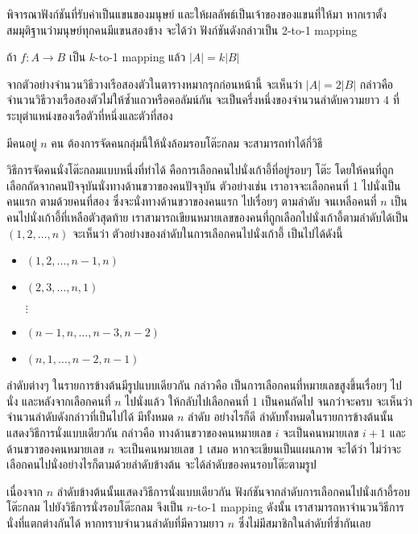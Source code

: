 \begin{example}
พิจารณาฟังก์ชันที่รับค่าเป็นแขนของมนุษย์ และให้ผลลัพธ์เป็นเจ้าของของแขนที่ให้มา \enskip หากเราตั้งสมมุติฐานว่ามนุษย์ทุกคนมีแขนสองข้าง จะได้ว่า ฟังก์ชันดังกล่าวเป็น 2-to-1 mapping
\end{example}

\begin{theorem}
ถ้า $f:A\to B$ เป็น $k$-to-1 mapping แล้ว $|A|=k|B|$
\end{theorem}

จากตัวอย่างจำนวนวิธีวางเรือสองตัวในตารางหมากรุกก่อนหน้านี้ จะเห็นว่า $|A|=2|B|$ กล่าวคือ จำนวนวิธีวางเรือสองตัวไม่ให้ซ้ำแถวหรือคอลัมน์กัน จะเป็นครึ่งหนึ่งของจำนวนลำดับความยาว 4 ที่ระบุตำแหน่งของเรือตัวที่หนึ่งและตัวที่สอง

\begin{example}
มีคนอยู่ $n$ คน ต้องการจัดคนกลุ่มนี้ให้นั่งล้อมรอบโต๊ะกลม จะสามารถทำได้กี่วิธี

วิธีการจัดคนนั่งโต๊ะกลมแบบหนึ่งที่ทำได้ คือการเลือกคนไปนั่งเก้าอี้ที่อยู่รอบๆ โต๊ะ โดยให้คนที่ถูกเลือกถัดจากคนปัจจุบันนั่งทางด้านขวาของคนปัจจุบัน \enskip ตัวอย่างเช่น เราอาจจะเลือกคนที่ 1 ไปนั่งเป็นคนแรก ตามด้วยคนที่สอง ซึ่งจะนั่งทางด้านขวาของคนแรก ไปเรื่อยๆ ตามลำดับ จนเหลือคนที่ $n$ เป็นคนไปนั่งเก้าอี้ที่เหลือตัวสุดท้าย \enskip เราสามารถเขียนหมายเลขของคนที่ถูกเลือกไปนั่งเก้าอี้ตามลำดับได้เป็น $(1,2,\ldots,n)$ \enskip จะเห็นว่า ตัวอย่างของลำดับในการเลือกคนไปนั่งเก้าอี้ เป็นไปได้ดังนี้
\begin{itemize}[]
\item $(1,2,\ldots,n-1,n)$
\item $(2,3,\ldots,n,1)$
\item[$\vdots$]
\item $(n-1,n,\ldots,n-3,n-2)$
\item $(n,1,\ldots,n-2,n-1)$
\end{itemize}
ลำดับต่างๆ ในรายการข้างต้นมีรูปแบบเดียวกัน กล่าวคือ เป็นการเลือกคนที่หมายเลขสูงขึ้นเรื่อยๆ ไปนั่ง และหลังจากเลือกคนที่ $n$ ไปนั่งแล้ว ให้กลับไปเลือกคนที่ 1 เป็นคนถัดไป จนกว่าจะครบ \enskip จะเห็นว่า จำนวนลำดับดังกล่าวที่เป็นไปได้ มีทั้งหมด $n$ ลำดับ \enskip อย่างไรก็ดี ลำดับทั้งหมดในรายการข้างต้นนั้นแสดงวิธีการนั่งแบบเดียวกัน กล่าวคือ ทางด้านขวาของคนหมายเลข $i$ จะเป็นคนหมายเลข $i+1$ และด้านขวาของคนหมายเลข $n$ จะเป็นคนหมายเลข 1 เสมอ \enskip หากจะเขียนเป็นแผนภาพ จะได้ว่า ไม่ว่าจะเลือกคนไปนั่งอย่างไรก็ตามด้วยลำดับข้างต้น จะได้ลำดับของคนรอบโต๊ะตามรูป
\begin{center}
\end{center}
เนื่องจาก $n$ ลำดับข้างต้นนั้นแสดงวิธีการนั่งแบบเดียวกัน ฟังก์ชันจากลำดับการเลือกคนไปนั่งเก้าอี้รอบโต๊ะกลม ไปยังวิธีการนั่งรอบโต๊ะกลม จึงเป็น $n$-to-1 mapping \enskip ดังนั้น เราสามารถหาจำนวนวิธีการนั่งที่แตกต่างกันได้ หากทราบจำนวนลำดับที่มีความยาว $n$ ซึ่งไม่มีสมาชิกในลำดับที่ซ้ำกันเลย


\end{example}
